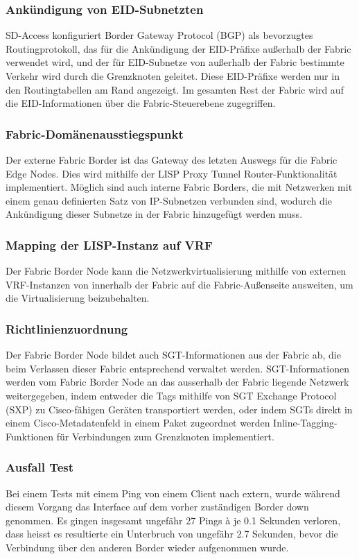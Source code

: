 \subsubsection{Ankündigung von EID-Subnetzten}
SD-Access konfiguriert Border Gateway Protocol (BGP) als bevorzugtes Routingprotokoll, das für die Ankündigung der EID-Präfixe außerhalb der Fabric verwendet wird, und der für EID-Subnetze von außerhalb der Fabric bestimmte Verkehr wird durch die Grenzknoten geleitet. Diese EID-Präfixe werden nur in den Routingtabellen am Rand angezeigt. Im gesamten Rest der Fabric wird auf die EID-Informationen über die Fabric-Steuerebene zugegriffen.

\subsubsection{Fabric-Domänenausstiegspunkt}
Der externe Fabric Border ist das Gateway des letzten Auswegs für die Fabric Edge Nodes. Dies wird mithilfe der LISP Proxy Tunnel Router-Funktionalität implementiert. Möglich sind auch interne Fabric Borders, die mit Netzwerken mit einem genau definierten Satz von IP-Subnetzen verbunden sind, wodurch die Ankündigung dieser Subnetze in der Fabric hinzugefügt werden muss.

\subsubsection{Mapping der LISP-Instanz auf VRF}
Der Fabric Border Node kann die Netzwerkvirtualisierung mithilfe von externen VRF-Instanzen von innerhalb der Fabric auf die Fabric-Außenseite ausweiten, um die Virtualisierung beizubehalten.

\subsubsection{Richtlinienzuordnung}
Der Fabric Border Node bildet auch SGT-Informationen aus der Fabric ab, die beim Verlassen dieser Fabric entsprechend verwaltet werden. SGT-Informationen werden vom Fabric Border Node an das ausserhalb der Fabric liegende Netzwerk weitergegeben, indem entweder die Tags mithilfe von SGT Exchange Protocol (SXP) zu Cisco-fähigen Geräten transportiert werden, oder indem SGTs direkt in einem Cisco-Metadatenfeld in einem Paket zugeordnet werden Inline-Tagging-Funktionen für Verbindungen zum Grenzknoten implementiert.

\subsubsection{Ausfall Test}
Bei einem Tests mit einem Ping von einem Client nach extern, wurde während diesem Vorgang das Interface auf dem vorher zuständigen Border down genommen. Es gingen insgesamt ungefähr 27 Pings à je 0.1 Sekunden verloren, dass heisst es resultierte ein Unterbruch von ungefähr 2.7 Sekunden, bevor die Verbindung über den anderen Border wieder aufgenommen wurde.


